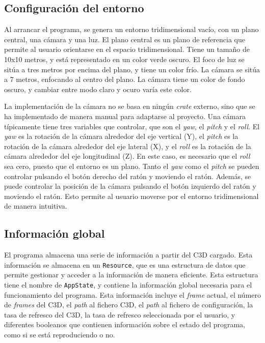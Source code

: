 \subsection{Configuración del entorno} \label{sec:bevy-configuracion}

Al arrancar el programa, se genera un entorno tridimensional vacío, con un plano central, una cámara y una luz. El plano central es un plano de referencia que permite al usuario orientarse en el espacio tridimensional. Tiene un tamaño de 10x10 metros, y está representado en un color verde oscuro. El foco de luz se sitúa a tres metros por encima del plano, y tiene un color frío. La cámara se sitúa a 7 metros, enfocando al centro del plano. La cámara tiene un color de fondo oscuro, y cambiar entre modo claro y ocuro varía este color.

La implementación de la cámara no se basa en ningún \textit{crate} externo, sino que se ha implementado de manera manual para adaptarse al proyecto. Una cámara típicamente tiene tres variables que controlar, que son el \textit{yaw}, el \textit{pitch} y el \textit{roll}. El \textit{yaw} es la rotación de la cámara alrededor del eje vertical (Y), el \textit{pitch} es la rotación de la cámara alrededor del eje lateral (X), y el \textit{roll} es la rotación de la cámara alrededor del eje longitudinal (Z). En este caso, es necesario que el \textit{roll} sea cero, puesto que el entorno es un plano. Tanto el \textit{yaw} como el \textit{pitch} se pueden controlar pulsando el botón derecho del ratón y moviendo el ratón. Además, se puede controlar la posición de la cámara pulsando el botón izquierdo del ratón y moviendo el ratón. Esto permite al usuario moverse por el entorno tridimensional de manera intuitiva.


\subsection{Información global} \label{sec:bevy-global}

El programa almacena una serie de información a partir del \ac{C3D} cargado. Esta información se almacena en un \texttt{Resource}, que es una estructura de datos que permite gestionar y acceder a la información de manera eficiente. Esta estructura tiene el nombre de \texttt{AppState}, y contiene la información global necesaria para el funcionamiento del programa. Esta información incluye el \textit{frame} actual, el número de \textit{frames} del \ac{C3D}, el \textit{path} al fichero \ac{C3D}, el \textit{path} al fichero de configuración, la tasa de refresco del \ac{C3D}, la tasa de refresco seleccionada por el usuario, y diferentes booleanos que contienen información sobre el estado del programa, como si se está reproduciendo o no.


